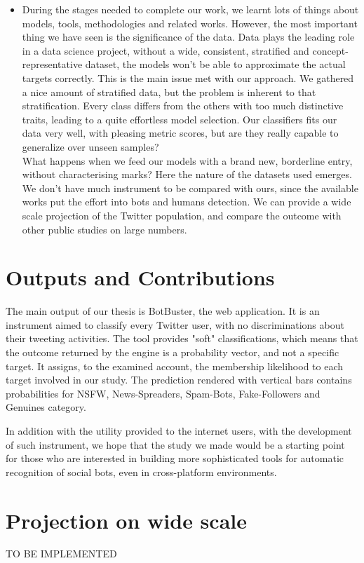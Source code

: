 \begin{itemize}
\item[\PencilRight] During the stages needed to complete our work, we learnt lots of things about models, tools, methodologies and related works. However, the most important thing we have seen is the significance of the data. Data plays the leading role in a data science project, without a wide, consistent, stratified and concept-representative dataset, the models won't be able to approximate the actual targets correctly. This is the main issue met with our approach.
We gathered a nice amount of stratified data, but the problem is inherent to that stratification. Every class differs from the others with too much distinctive traits, leading to a quite effortless model selection. Our classifiers fits our data very well, with pleasing metric scores, but are they really capable to generalize over unseen samples?\\
What happens when we feed our models with a brand new, borderline entry, without characterising marks? Here the nature of the datasets used emerges. We don't have much instrument to be compared with ours, since the available works put the effort into bots and humans detection. We can provide a wide scale projection of the Twitter population, and compare the outcome with other public studies on large numbers.
\end{itemize}


\section{Outputs and Contributions}
The main output of our thesis is BotBuster, the web application. It is an instrument aimed to classify every Twitter user, with no discriminations about their tweeting activities. The tool provides "soft" classifications, which means that the outcome returned by the engine is a probability vector, and not a specific target. It assigns, to the examined account, the membership likelihood to each target involved in our study.
The prediction rendered with vertical bars contains probabilities for NSFW, News-Spreaders, Spam-Bots, Fake-Followers and Genuines category.

In addition with the utility provided to the internet users, with the development of such instrument, we hope that the study we made would be a starting point for those who are interested in building more sophisticated tools for automatic recognition of social bots, even in cross-platform environments.

\section{Projection on wide scale}
TO BE IMPLEMENTED


